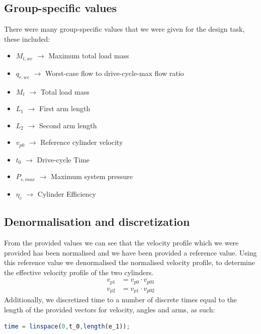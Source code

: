 \documentclass[12pt]{article}
\begin{document}
        \subsection{Group-specific values}
            There were many group-specific values that we were given for the design task, these included:
            \begin{itemize}
                \item $M_{t,wc}$ $\rightarrow$ Maximum total load mass
                \item $q_{r,wc}$ $\rightarrow$ Worst-case flow to drive-cycle-max flow ratio
                \item $M_t$ $\rightarrow$ Total load mass
                \item $L_1$ $\rightarrow$ First arm length
                \item $L_2$ $\rightarrow$ Second arm length
                \item $v_{p0}$ $\rightarrow$ Reference cylinder velocity
                \item $t_0$ $\rightarrow$ Drive-cycle Time
                \item $P_{s,max}$ $\rightarrow$ Maximum system pressure
                \item $\eta_c$ $\rightarrow$ Cylinder Efficiency
            \end{itemize}    
            
        \subsection{Denormalisation and discretization}

            From the provided values we can see that the velocity profile which we were provided has been normalised and we have been provided a reference value.
            Using this reference value we denormalised the normalised velocity profile, to determine the effective velocity profile of the two cylinders.
            \begin{align*}
                v_{p1} &= v_{p0} \cdot v_{p01}\\
                v_{p2} &= v_{p1} \cdot v_{p02}
            \end{align*}
            Additionally, we discretized time to a number of discrete times equal to the length of the provided vectors for velocity, angles and arms, as such:
            \begin{lstlisting}[language=Octave]
time = linspace(0,t_0,length(e_1));
            \end{lstlisting}
\end{document}
